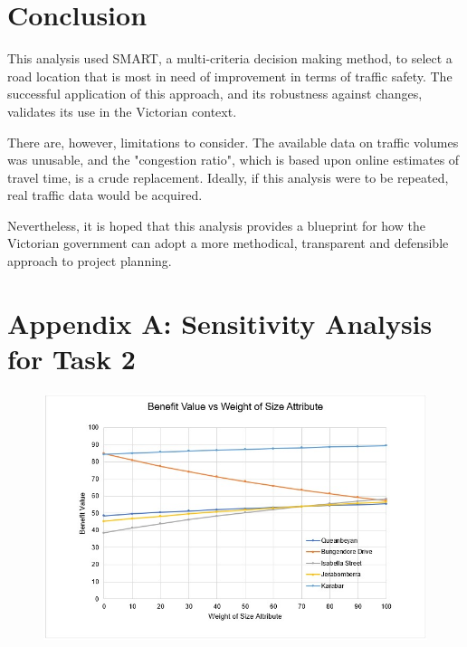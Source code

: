 \documentclass[11pt, a4paper]{article}
\begin{document}
    \section{Conclusion}

    This analysis used SMART, a multi-criteria decision making method, to select a road location that is most in need of improvement in terms of traffic safety. The successful application of this approach, and its robustness against changes, validates its use in the Victorian context.

    There are, however, limitations to consider. The available data on traffic volumes was unusable, and the "congestion ratio", which is based upon online estimates of travel time, is a crude replacement. Ideally, if this analysis were to be repeated, real traffic data would be acquired.
    
    Nevertheless, it is hoped that this analysis provides a blueprint for how the Victorian government can adopt a more methodical, transparent and defensible approach to project planning.

    \newpage
    \printbibliography

    \newpage
    \section*{Appendix A: Sensitivity Analysis for Task 2}

        \begin{figure}[!ht]
            \centering
            \includegraphics[width=\textwidth]{appendices/1a.jpg}
        \end{figure}
\end{document}
